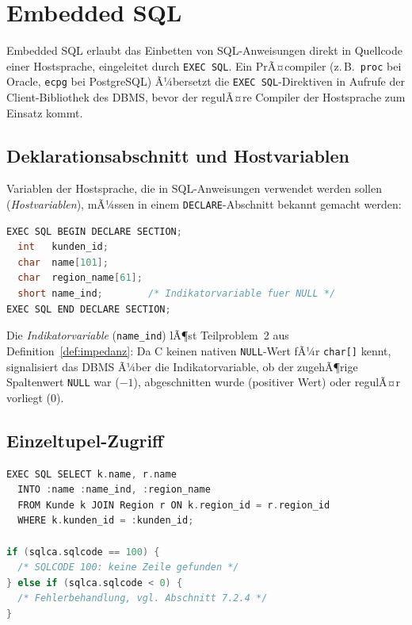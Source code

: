 ﻿\documentclass[a4paper,12pt]{report}
\theoremstyle{definition}
\theoremstyle{remark}
\begin{document}
\section{Embedded SQL}
\label{sec:embedded-sql}

Embedded SQL erlaubt das Einbetten von SQL-Anweisungen direkt in
Quellcode einer Hostsprache, eingeleitet durch \texttt{EXEC SQL}. Ein
PrÃ¤compiler (z.\,B.\ \texttt{proc} bei Oracle, \texttt{ecpg} bei
PostgreSQL) Ã¼bersetzt die \texttt{EXEC SQL}-Direktiven in Aufrufe der
Client-Bibliothek des DBMS, bevor der regulÃ¤re Compiler der Hostsprache
zum Einsatz kommt.

\subsection{Deklarationsabschnitt und Hostvariablen}

Variablen der Hostsprache, die in SQL-Anweisungen verwendet werden
sollen (\emph{Hostvariablen}), mÃ¼ssen in einem
\texttt{DECLARE}-Abschnitt bekannt gemacht werden:

\begin{lstlisting}[language=C]
EXEC SQL BEGIN DECLARE SECTION;
  int   kunden_id;
  char  name[101];
  char  region_name[61];
  short name_ind;        /* Indikatorvariable fuer NULL */
EXEC SQL END DECLARE SECTION;
\end{lstlisting}

Die \emph{Indikatorvariable} (\texttt{name\_ind}) lÃ¶st Teilproblem~2
aus Definition~\ref{def:impedanz}: Da C keinen nativen
\texttt{NULL}-Wert fÃ¼r \texttt{char[]} kennt, signalisiert das DBMS
Ã¼ber die Indikatorvariable, ob der zugehÃ¶rige Spaltenwert
\texttt{NULL} war ($-1$), abgeschnitten wurde (positiver Wert) oder
regulÃ¤r vorliegt ($0$).

\subsection{Einzeltupel-Zugriff}

\begin{lstlisting}[language=C]
EXEC SQL SELECT k.name, r.name
  INTO :name :name_ind, :region_name
  FROM Kunde k JOIN Region r ON k.region_id = r.region_id
  WHERE k.kunden_id = :kunden_id;

if (sqlca.sqlcode == 100) {
  /* SQLCODE 100: keine Zeile gefunden */
} else if (sqlca.sqlcode < 0) {
  /* Fehlerbehandlung, vgl. Abschnitt 7.2.4 */
}
\end{lstlisting}
\end{document}
